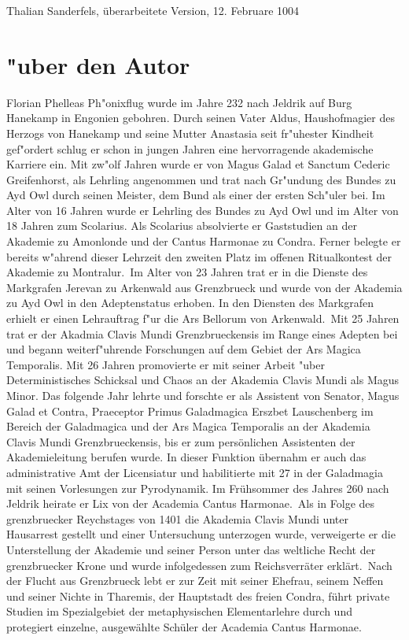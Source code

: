 \documentclass[a5paper,8pt]{book}
\begin{document}
\begin{small}
\begin{description}
\end{description}

\end{small}

Thalian Sanderfels, überarbeitete Version, 12. Februare 1004

\appendix



\chapter{"uber den Autor}

Florian Phelleas Ph"onixflug wurde im Jahre 232 nach Jeldrik auf Burg Hanekamp in Engonien gebohren. Durch seinen Vater Aldus, Haushofmagier des Herzogs von Hanekamp 
und seine Mutter Anastasia seit fr"uhester Kindheit gef"ordert schlug er schon in jungen Jahren eine hervorragende akademische Karriere ein.
Mit zw"olf Jahren wurde er von Magus Galad et Sanctum Cederic Greifenhorst, als Lehrling angenommen und trat nach Gr"undung des Bundes zu Ayd Owl durch seinen Meister, 
dem Bund als einer der ersten Sch"uler bei. Im Alter von 16 Jahren wurde er Lehrling des Bundes zu Ayd Owl und im Alter von 18 Jahren zum Scolarius.
Als Scolarius absolvierte er Gaststudien an der Akademie zu Amonlonde und der Cantus Harmonae zu Condra. Ferner belegte er bereits w"ahrend dieser Lehrzeit den zweiten 
Platz im offenen Ritualkontest der Akademie zu Montralur.\
Im Alter von 23 Jahren trat er in die Dienste des Markgrafen Jerevan zu Arkenwald aus Grenzbrueck und wurde von der Akademia zu Ayd Owl in den Adeptenstatus erhoben. 
In den Diensten des Markgrafen erhielt er einen Lehrauftrag f"ur die Ars Bellorum von Arkenwald.\
Mit 25 Jahren trat er der Akadmia Clavis Mundi Grenzbrueckensis im Range eines Adepten bei und begann weiterf"uhrende Forschungen auf dem Gebiet der Ars Magica Temporalis.
Mit 26 Jahren promovierte er mit seiner Arbeit "uber Deterministisches Schicksal und Chaos an der Akademia Clavis Mundi als Magus Minor.
Das folgende Jahr lehrte und forschte er als Assistent von Senator, Magus Galad et Contra, Praeceptor Primus Galadmagica Erszbet Lauschenberg im Bereich der Galadmagica 
und der Ars Magica Temporalis an der Akademia Clavis Mundi Grenzbrueckensis, bis er zum persönlichen Assistenten der Akademieleitung berufen wurde. In dieser Funktion
übernahm er auch das administrative Amt der Licensiatur und habilitierte mit 27 in der Galadmagia mit seinen Vorlesungen zur Pyrodynamik. 
Im Frühsommer des Jahres 260 nach Jeldrik heirate er Lix von der Academia Cantus Harmonae.\
Als in Folge des
grenzbruecker Reychstages von 1401 die Akademia Clavis Mundi unter Hausarrest gestellt und einer Untersuchung unterzogen wurde, verweigerte er die Unterstellung der Akademie
und seiner Person unter das weltliche Recht der grenzbruecker Krone und wurde infolgedessen zum Reichsverräter erklärt.\
Nach der Flucht aus Grenzbrueck lebt er zur Zeit mit seiner Ehefrau, seinem Neffen und seiner Nichte in Tharemis, der Hauptstadt des freien Condra, führt private Studien
im Spezialgebiet der metaphysischen Elementarlehre durch und protegiert einzelne, ausgewählte Schüler der Academia Cantus Harmonae.
\end{document}
